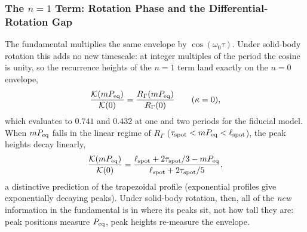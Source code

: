 \documentclass[preprint]{aastex702}
\begin{document}
\subsubsection{The $n=1$ Term: Rotation Phase and the Differential-Rotation Gap} \label{subsec:harmonic_n1}

The fundamental multiplies the same envelope by $\cos(\omega_0\tau)$. Under solid-body rotation this adds no new timescale: at integer multiples of the period the cosine is unity, so the recurrence heights of the $n = 1$ term land exactly on the $n = 0$ envelope,
\begin{equation}
    \frac{\mathcal{K}(m P_{\rm eq})}{\mathcal{K}(0)} = \frac{R_\Gamma(m P_{\rm eq})}{R_\Gamma(0)}
    \qquad (\kappa = 0),
    \label{eq:peak_height_ratio}
\end{equation}
which evaluates to $0.741$ and $0.432$ at one and two periods for the fiducial model. When $m P_{\rm eq}$ falls in the linear regime of $R_\Gamma$ ($\tau_{\rm spot} < m P_{\rm eq} < \ell_{\rm spot}$), the peak heights decay linearly,
\begin{equation}
    \frac{\mathcal{K}(mP_{\rm eq})}{\mathcal{K}(0)} = \frac{\ell_{\rm spot} + 2\tau_{\rm spot}/3 - mP_{\rm eq}}{\ell_{\rm spot} + 2\tau_{\rm spot}/5},
    \label{eq:linear_peak_decay}
\end{equation}
a distinctive prediction of the trapezoidal profile (exponential profiles give exponentially decaying peaks). Under solid-body rotation, then, all of the \emph{new} information in the fundamental is in where its peaks sit, not how tall they are: peak positions measure $P_{\rm eq}$, peak heights re-measure the envelope.
\end{document}
